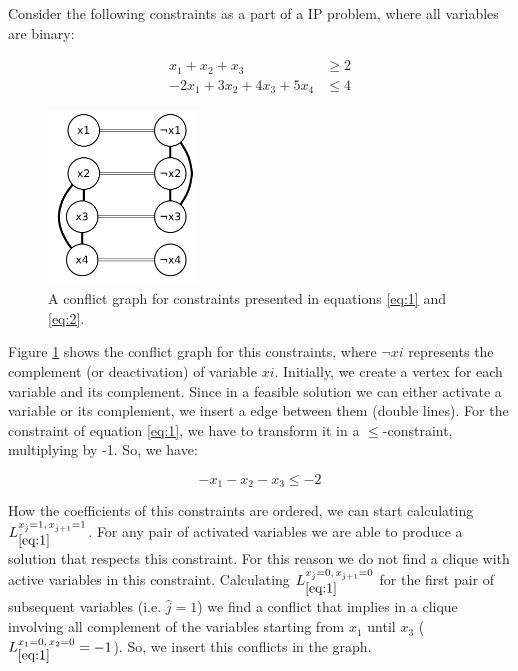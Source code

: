 \documentclass{endm}
\begin{document}
\begin{example}

Consider the following constraints as a part of a IP problem, where all variables are binary:

\begin{align}
x_1 + x_2 + x_3  & \geq 2\label{eq:1}\\
- 2x_1 + 3x_2 + 4x_3 + 5x_4 & \leq 4\label{eq:2}
\end{align}

\begin{figure}[!ht]
  \begin{center}
    \includegraphics[width=4cm]{graph.png}
  \end{center}
  \caption{A conflict graph for constraints presented in equations \ref{eq:1} and \ref{eq:2}.}
  \label{graph}
\end{figure}

Figure \ref{graph} shows the conflict graph for this constraints, where $\neg xi$ represents the complement (or deactivation) of variable $xi$. Initially, we create a vertex for each variable and its complement. Since in a feasible solution we can either activate a variable or its complement, we insert a edge between them (double lines). For the constraint of equation \ref{eq:1}, we have to transform it in a $\leq$-constraint, multiplying by -1. So, we have:

\begin{equation}
- x_1 - x_2 - x_3 \leq - 2
\end{equation}

How the coefficients of this constraints are ordered, we can start calculating $L_{\ref{eq:1}}^{x_{\hat{j}}=1,\, x_{\hat{j}+1}=1}$. For any pair of activated variables we are able to produce a solution that respects this constraint. For this reason we do not find a clique with active variables in this constraint. Calculating $L_{\ref{eq:1}}^{x_{\hat{j}}=0,\, x_{\hat{j}+1}=0}$ for the first pair of subsequent variables (i.e. $\hat{j}=1$) we find a conflict that implies in a clique involving all complement of the variables starting from $x_1$ until $x_3$ ($L_{\ref{eq:1}}^{x_1=0,\, x_2=0} = -1$). So, we insert this conflicts in the graph.


\end{example}
\end{document}
